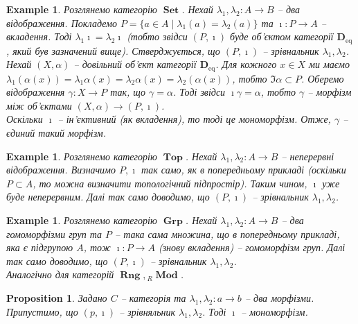 \documentclass[a4paper, 10pt]{article}
\theoremstyle{theoremdd}
\newtheorem{example}[theorem]{Example}
\newtheorem{proposition}[theorem]{Proposition}
\DeclareMathOperator{\Set}{\textbf{Set}}
\DeclareMathOperator{\Grp}{\textbf{Grp}}
\DeclareMathOperator{\Rng}{\textbf{Rng}}
\DeclareMathOperator{\Top}{\textbf{Top}}
\DeclareMathOperator{\Mod}{\textbf{Mod}}
\begin{document}
\begin{example}
Розглянемо категорію $\Set$. Нехай $\lambda_1,\lambda_2 \colon A \to B$ -- два відображення. Покладемо $P = \{a \in A \mid \lambda_1(a) = \lambda_2(a)\}$ та $\imath \colon P \to A$ -- вкладення. Тоді $\lambda_1 \imath = \lambda_2 \imath$ (тобто звідси $(P,\imath)$ буде об'єктом категорії $\textbf{D}_{\text{eq}}$, який був зазначений вище). Стверджується, що $(P,\imath)$ -- зрівнальник $\lambda_1,\lambda_2$.\\
Нехай $(X,\alpha)$ -- довільний об'єкт категорії $\textbf{D}_{\text{eq}}$. Для кожного $x \in X$ ми маємо $\lambda_1(\alpha(x)) = \lambda_1 \alpha (x) = \lambda_2 \alpha(x) = \lambda_2(\alpha(x))$, тобто $\Im \alpha \subset P$. Оберемо відображення $\gamma \colon X \to P$ так, що $\gamma = \alpha$. Тоді звідси $\imath \gamma = \alpha$, тобто $\gamma$ -- морфізм між об'єктами $(X,\alpha) \to (P,\imath)$.\\
Оскільки $\imath$ -- ін'єктивний (як вкладення), то тоді це мономорфізм. Отже, $\gamma$ -- єдиний такий морфізм.
\end{example}

\begin{example}
Розглянемо категорію $\Top$. Нехай $\lambda_1, \lambda_2 \colon A \to B$ -- неперервні відображення. Визначимо $P, \imath$ так само, як в попередньому прикладі (оскільки $P \subset A$, то можна визначити топологічний підпростір). Таким чином, $\imath$ уже буде неперервним. Далі так само доводимо, що $(P,\imath)$ -- зрівнальник $\lambda_1,\lambda_2$.
\end{example}

\begin{example}
Розглянемо категорію $\Grp$. Нехай $\lambda_1,\lambda_2 \colon A \to B$ -- два гомоморфізми груп та $P$ -- така сама множина, що в попередньому прикладі, яка є підгрупою $A$, тож $\imath \colon P \to A$ (знову вкладення) -- гомоморфізм груп. Далі так само доводимо, що $(P,\imath)$ -- зрівнальник $\lambda_1,\lambda_2$.
\bigskip \\
Аналогічно для категорій $\Rng, {}_R\Mod$.
\end{example}

\begin{proposition}
Задано $C$ -- категорія та $\lambda_1, \lambda_2 \colon a \to b$ -- два морфізми. Припустимо, що $(p,\imath)$ -- зрівняльник $\lambda_1,\lambda_2$. Тоді $\imath$ -- мономорфізм.
\end{proposition}
\end{document}
